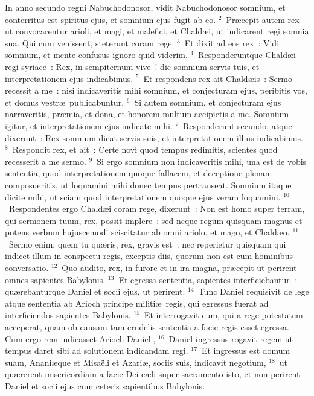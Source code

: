\bchapter
\lettrine[lines=3,image=true,loversize=0.05,lraise=-0.03]{I}{}n anno secundo regni Nabuchodonosor, vidit Nabuchodonosor somnium, et conterritus est spiritus ejus, et somnium ejus fugit ab eo.
${}^{2}$~Pr\ae cepit autem rex ut convocarentur arioli, et magi, et malefici, et Chald\ae i, ut indicarent regi somnia sua. Qui cum venissent, steterunt coram rege.
${}^{3}$~Et dixit ad eos rex~: Vidi somnium, et mente confusus ignoro quid viderim.
${}^{4}$~Responderuntque Chald\ae i regi syriace~: Rex, in sempiternum vive~! dic somnium servis tuis, et interpretationem ejus indicabimus.
${}^{5}$~Et respondens rex ait Chald\ae is~: Sermo recessit a me~: nisi indicaveritis mihi somnium, et conjecturam ejus, peribitis vos, et domus vestr\ae\ publicabuntur.
${}^{6}$~Si autem somnium, et conjecturam ejus narraveritis, pr\ae mia, et dona, et honorem multum accipietis a me. Somnium igitur, et interpretationem ejus indicate mihi.
${}^{7}$~Responderunt secundo, atque dixerunt~: Rex somnium dicat servis suis, et interpretationem illius indicabimus.
${}^{8}$~Respondit rex, et ait~: Certe novi quod tempus redimitis, scientes quod recesserit a me sermo.
${}^{9}$~Si ergo somnium non indicaveritis mihi, una est de vobis sententia, quod interpretationem quoque fallacem, et deceptione plenam composueritis, ut loquamini mihi donec tempus pertranseat. Somnium itaque dicite mihi, ut sciam quod interpretationem quoque ejus veram loquamini.
${}^{10}$~Respondentes ergo Chald\ae i coram rege, dixerunt~: Non est homo super terram, qui sermonem tuum, rex, possit implere~: sed neque regum quisquam magnus et potens verbum hujuscemodi sciscitatur ab omni ariolo, et mago, et Chald\ae o.
${}^{11}$~Sermo enim, quem tu qu\ae ris, rex, gravis est~: nec reperietur quisquam qui indicet illum in conspectu regis, exceptis diis, quorum non est cum hominibus conversatio.
${}^{12}$~Quo audito, rex, in furore et in ira magna, pr\ae cepit ut perirent omnes sapientes Babylonis.
${}^{13}$~Et egressa sententia, sapientes interficiebantur~: qu\ae rebanturque Daniel et socii ejus, ut perirent.
${}^{14}$~Tunc Daniel requisivit de lege atque sententia ab Arioch principe militi\ae\ regis, qui egressus fuerat ad interficiendos sapientes Babylonis.
${}^{15}$~Et interrogavit eum, qui a rege potestatem acceperat, quam ob causam tam crudelis sententia a facie regis esset egressa. Cum ergo rem indicasset Arioch Danieli,
${}^{16}$~Daniel ingressus rogavit regem ut tempus daret sibi ad solutionem indicandam regi.
${}^{17}$~Et ingressus est domum suam, Anani\ae que et Misa\"eli et Azari\ae , sociis suis, indicavit negotium,
${}^{18}$~ut qu\ae rerent misericordiam a facie Dei c\ae li super sacramento isto, et non perirent Daniel et socii ejus cum ceteris sapientibus Babylonis.


